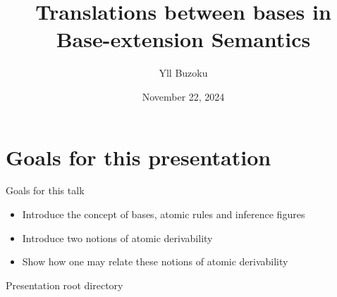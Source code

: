 \documentclass{beamer}
\title[Translations between bases in B-eS]{Translations between bases in Base-extension Semantics}
\author{Yll Buzoku}
\institute[UCL]{%
  Department of Computer Science \\ %
  University College London
}
\date{November 22, 2024}
\begin{document}
\begin{frame}
\titlepage
\end{frame}
\section*{Goals for this presentation}
\begin{frame}{Goals for this talk}
\begin{itemize}
\item Introduce the concept of bases, atomic rules and inference figures
\item Introduce two notions of atomic derivability
\item Show how one may relate these notions of atomic derivability
\end{itemize}
\end{frame}
\begin{frame}{Presentation root directory}
\tableofcontents
\end{frame}
\end{document}
